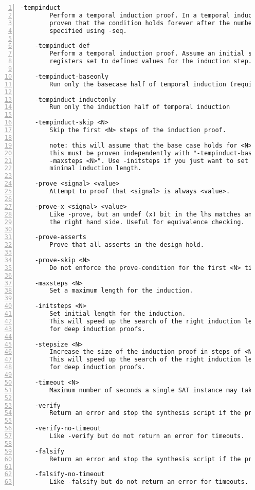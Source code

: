 \begin{lstlisting}[numbers=left,frame=single]
    -tempinduct
        Perform a temporal induction proof. In a temporal induction proof it is
        proven that the condition holds forever after the number of time steps
        specified using -seq.

    -tempinduct-def
        Perform a temporal induction proof. Assume an initial state with all
        registers set to defined values for the induction step.

    -tempinduct-baseonly
        Run only the basecase half of temporal induction (requires -maxsteps)

    -tempinduct-inductonly
        Run only the induction half of temporal induction

    -tempinduct-skip <N>
        Skip the first <N> steps of the induction proof.

        note: this will assume that the base case holds for <N> steps.
        this must be proven independently with "-tempinduct-baseonly
        -maxsteps <N>". Use -initsteps if you just want to set a
        minimal induction length.

    -prove <signal> <value>
        Attempt to proof that <signal> is always <value>.

    -prove-x <signal> <value>
        Like -prove, but an undef (x) bit in the lhs matches any value on
        the right hand side. Useful for equivalence checking.

    -prove-asserts
        Prove that all asserts in the design hold.

    -prove-skip <N>
        Do not enforce the prove-condition for the first <N> time steps.

    -maxsteps <N>
        Set a maximum length for the induction.

    -initsteps <N>
        Set initial length for the induction.
        This will speed up the search of the right induction length
        for deep induction proofs.

    -stepsize <N>
        Increase the size of the induction proof in steps of <N>.
        This will speed up the search of the right induction length
        for deep induction proofs.

    -timeout <N>
        Maximum number of seconds a single SAT instance may take.

    -verify
        Return an error and stop the synthesis script if the proof fails.

    -verify-no-timeout
        Like -verify but do not return an error for timeouts.

    -falsify
        Return an error and stop the synthesis script if the proof succeeds.

    -falsify-no-timeout
        Like -falsify but do not return an error for timeouts.
\end{lstlisting}

